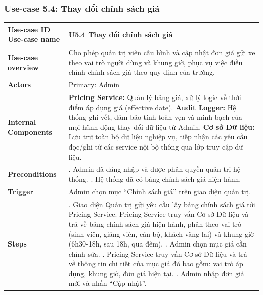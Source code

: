 \subsubsection{Use-case 5.4: Thay đổi chính sách giá}
\vspace{0.5cm}
\noindent
{\small
\renewcommand{\arraystretch}{0.95}
\begin{longtable}{|>{\raggedright\arraybackslash}p{4cm}|>{\raggedright\arraybackslash}p{11.5cm}|}
\hline
\textbf{Use-case ID} \newline \textbf{Use-case name} & U5.4 \newline \textbf{Thay đổi chính sách giá} \\ \hline
\endhead
\textbf{Use-case overview} & Cho phép quản trị viên cấu hình và cập nhật đơn giá gửi xe theo vai trò người dùng và khung giờ, phục vụ việc điều chỉnh chính sách giá theo quy định của trường. \\ \hline
\textbf{Actors} & Primary: Admin \\ \hline
\textbf{Internal Components} &
\textbf{Pricing Service:} Quản lý bảng giá, xử lý logic về thời điểm áp dụng giá (effective date). \newline
\textbf{Audit Logger:} Hệ thống ghi vết, đảm bảo tính toàn vẹn và minh bạch của mọi hành động thay đổi dữ liệu từ Admin. \newline
\textbf{Cơ sở Dữ liệu:} Lưu trữ toàn bộ dữ liệu nghiệp vụ, tiếp nhận các yêu cầu đọc/ghi từ các service nội bộ thông qua lớp truy cập dữ liệu. \\ \hline
\textbf{Preconditions} &
1. Admin đã đăng nhập và được phân quyền quản trị hệ thống. \newline
2. Hệ thống đã có bảng chính sách giá hiện hành. \\ \hline
\textbf{Trigger} & Admin chọn mục ``Chính sách giá'' trên giao diện quản trị. \\ \hline
\textbf{Steps} &
1. Giao diện Quản trị gửi yêu cầu lấy bảng chính sách giá tới Pricing Service. Pricing Service truy vấn Cơ sở Dữ liệu và trả về bảng chính sách giá hiện hành, phân theo vai trò (sinh viên, giảng viên, cán bộ, khách vãng lai) và khung giờ (6h30-18h, sau 18h, qua đêm). \newline
2. Admin chọn mục giá cần chỉnh sửa. \newline
3. Pricing Service truy vấn Cơ sở Dữ liệu và trả về thông tin chi tiết của mục giá đó bao gồm: vai trò áp dụng, khung giờ, đơn giá hiện tại. \newline
4. Admin nhập đơn giá mới và nhấn ``Cập nhật''. \newline

\end{longtable}}
